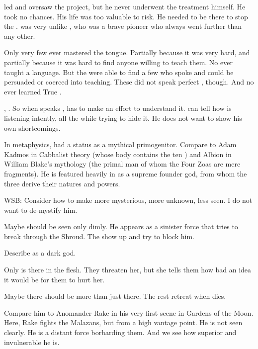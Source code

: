 \Azraid led and oversaw the \neoresphan project, but he never underwent the treatment himself. 
He took no chances. 
His life was too valuable to risk.
He needed to be there to stop the \banes.
\Azraid was very unlike \Sethicus, who was a brave pioneer who always went further than any other. 

Only very few \resphain ever mastered the \Draconic tongue. 
Partially because it was very hard, and partially because it was hard to find anyone willing to teach them. 
No \dragon ever taught a \resphan language. 
But the \resphain were able to find a few \quiljaaran who spoke \Draconic and could be persuaded or coerced into teaching. 
These \quiljaaran did not speak perfect \Draconic, though. 
And no \resphan ever learned True \Draconic. 

, \Teshrial {}. 
So when \Ishnaruchaefir speaks \Draconic, \Teshrial has to make an effort to understand it. 
\Criseis can tell how \Teshrial is listening intently, all the while trying to hide it.
He does not want to show his own shortcomings. 

In \draconian metaphysics, \Sethicus had a status as a mythical primogenitor. 
Compare to Adam Kadmos in Cabbalist theory (whose body contains the ten \sephiroth) and Albion in William Blake's mythology (the primal man of whom the Four Zoas are mere fragments). 
He is featured heavily in \WanderersInDarknessEmph as a supreme founder god, from whom the three  derive their natures and powers. 

WSB:
  Consider how to make \Ishnaruchaefir more mysterious, more unknown, less seen. 
  I do not want to de-mystify him. 
  
  Maybe \Ishnaruchaefir should be seen only dimly.
  He appears as a sinister force that tries to break through the Shroud.
  The \resphain show up and try to block him.
  
  Describe \Ishnaruchaefir as a dark \draconian god. 
  
  Only \Criseis is there in the flesh. 
  They threaten her, but she tells them how bad an idea it would be for them to hurt her. 
  
  Maybe there should be more \resphain than just \Teshrial there.
  The rest retreat when \Teshrial dies. 
  
  Compare him to Anomander Rake in his very first scene in Gardens of the Moon. 
  Here, Rake fights the Malazans, but from a high vantage point. 
  He is not seen clearly. 
  He is a distant force borbarding them. 
  And we see how superior and invulnerable he is.

